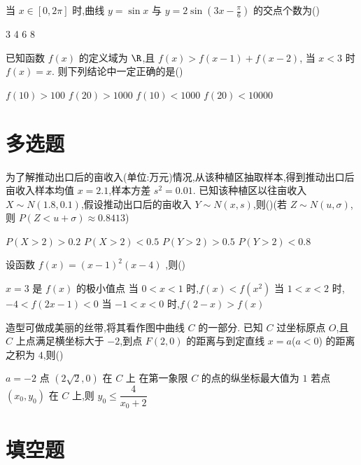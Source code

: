 \begin{problem}
当 \(x\in[0,2\pi]\) 时,曲线 \(y=\sin x\) 与 \(y=2\sin\!\left(3x-\frac{\pi}{6}\right)\) 的交点个数为(\quad)

\choices
    {3}
    {4}
    {6}
    {8}
\end{problem}

\begin{problem}
已知函数 \(f(x)\) 的定义域为 \(\R\),且
\(f(x)>f(x-1)+f(x-2)\),
当 \(x<3\) 时 \(f(x)=x\). 则下列结论中一定正确的是(\quad)

\choices
    {\(f(10)>100\)}
    {\(f(20)>1000\)}
    {\(f(10)<1000\)}
    {\(f(20)<10000\)}
\end{problem}

\section{多选题}

\begin{problem}
为了解推动出口后的亩收入(单位:万元)情况,从该种植区抽取样本,得到推动出口后亩收入样本均值 \(x=2.1\),样本方差 \(s^2=0.01\). 已知该种植区以往亩收入 \(X\sim N(1.8,0.1)\),假设推动出口后的亩收入 \(Y\sim N(x,s)\),则(\quad)(若 \(Z\sim N(u,\sigma)\),则 \(P(Z<u+\sigma)\approx0.8413\))

\choices
    {\(P(X>2)>0.2\)}
    {\(P(X>2)<0.5\)}
    {\(P(Y>2)>0.5\)}
    {\(P(Y>2)<0.8\)}
\end{problem}

\begin{problem}
设函数
\(f(x)=(x-1)^2(x-4)\)
,则(\quad)

\choices
    {\(x=3\) 是 \(f(x)\) 的极小值点}
    {当 \(0<x<1\) 时,\(f(x)<f(x^2)\)}
    {当 \(1<x<2\) 时,\(-4<f(2x-1)<0\)}
    {当 \(-1<x<0\) 时,\(f(2-x)>f(x)\)}
\end{problem}

\begin{problem}
造型可做成美丽的丝带,将其看作图中曲线 \(C\) 的一部分. 已知 \(C\) 过坐标原点 \(O\),且 \(C\) 上点满足横坐标大于 \(-2\),到点 \(F(2,0)\) 的距离与到定直线 \(x=a\)(\(a<0\)) 的距离之积为 \(4\),则(\quad)


\choices
    {\(a=-2\)}
    {点 \((2\sqrt2,0)\) 在 \(C\) 上}
    {在第一象限 \(C\) 的点的纵坐标最大值为 \(1\)}
    {若点 \((x_0,y_0)\) 在 \(C\) 上,则 \(y_0\le \dfrac{4}{x_0+2}\)}
\end{problem}

\section{填空题}

